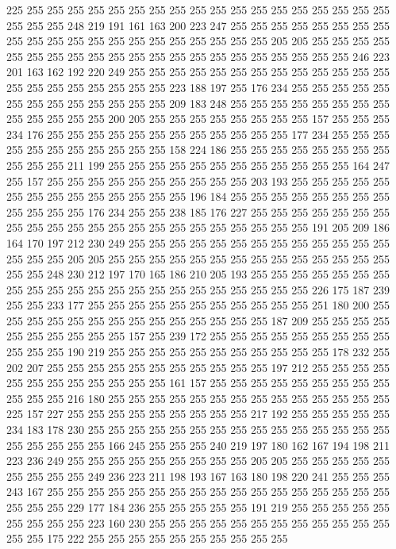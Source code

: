 225 255 255 255 255 255 255 255 255 255 255 255 255 255 255 255 255 255 255 255
255 255 248 219 191 161 163 200 223 247 255 255 255 255 255 255 255 255 255 255
255 255 255 255 255 255 255 255 255 255 255 205 205 255 255 255 255 255 255 255
255 255 255 255 255 255 255 255 255 255 255 255 255 255 246 223 201 163 162 192
220 249 255 255 255 255 255 255 255 255 255 255 255 255 255 255 255 255 255 255
255 255 255 223 188 197 255 176 234 255 255 255 255 255 255 255 255 255 255 255
255 255 209 183 248 255 255 255 255 255 255 255 255 255 255 255 255 255 200 205
255 255 255 255 255 255 255 255 157 255 255 255 234 176 255 255 255 255 255 255
255 255 255 255 255 255 177 234 255 255 255 255 255 255 255 255 255 255 255 158
224 186 255 255 255 255 255 255 255 255 255 255 255 211 199 255 255 255 255 255
255 255 255 255 255 255 255 164 247 255 157 255 255 255 255 255 255 255 255 255
255 203 193 255 255 255 255 255 255 255 255 255 255 255 255 255 255 196 184 255
255 255 255 255 255 255 255 255 255 255 255 176 234 255 255 238 185 176 227 255
255 255 255 255 255 255 255 255 255 255 255 255 255 255 255 255 255 255 255 255
255 191 205 209 186 164 170 197 212 230 249 255 255 255 255 255 255 255 255 255
255 255 255 255 255 255 255 205 205 255 255 255 255 255 255 255 255 255 255 255
255 255 255 255 255 248 230 212 197 170 165 186 210 205 193 255 255 255 255 255
255 255 255 255 255 255 255 255 255 255 255 255 255 255 255 255 255 226 175 187
239 255 255 233 177 255 255 255 255 255 255 255 255 255 255 255 251 180 200 255
255 255 255 255 255 255 255 255 255 255 255 255 255 187 209 255 255 255 255 255
255 255 255 255 255 157 255 239 172 255 255 255 255 255 255 255 255 255 255 255
255 190 219 255 255 255 255 255 255 255 255 255 255 255 178 232 255 202 207 255
255 255 255 255 255 255 255 255 255 255 197 212 255 255 255 255 255 255 255 255
255 255 255 255 161 157 255 255 255 255 255 255 255 255 255 255 255 255 216 180
255 255 255 255 255 255 255 255 255 255 255 255 255 255 225 157 227 255 255 255
255 255 255 255 255 255 217 192 255 255 255 255 255 234 183 178 230 255 255 255
255 255 255 255 255 255 255 255 255 255 255 255 255 255 255 255 255 166 245 255
255 255 240 219 197 180 162 167 194 198 211 223 236 249 255 255 255 255 255 255
255 255 255 205 205 255 255 255 255 255 255 255 255 255 249 236 223 211 198 193
167 163 180 198 220 241 255 255 255 243 167 255 255 255 255 255 255 255 255 255
255 255 255 255 255 255 255 255 255 255 255 229 177 184 236 255 255 255 255 255
191 219 255 255 255 255 255 255 255 255 255 223 160 230 255 255 255 255 255 255
255 255 255 255 255 255 255 255 175 222 255 255 255 255 255 255 255 255 255 255

